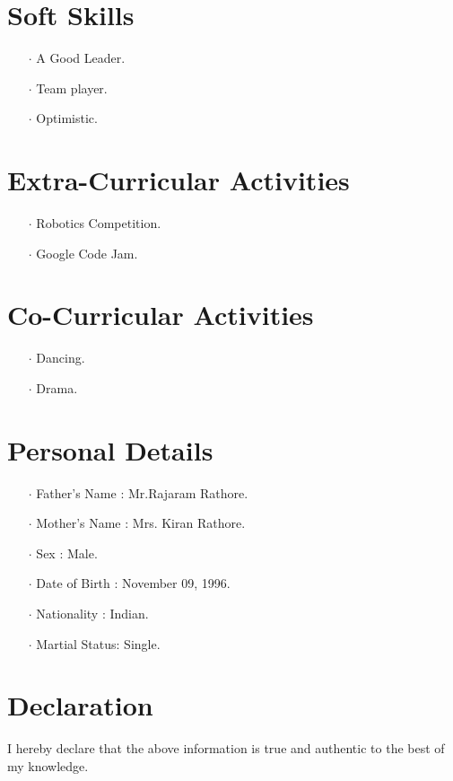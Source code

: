 \documentclass[12pt]{article}
\begin{document}
\section*{Soft Skills}
\begin{itemize}
\item[$\cdot$] A Good Leader.
\item[$\cdot$] Team player.
\item[$\cdot$] Optimistic. 
\end{itemize}
\section*{Extra-Curricular Activities}
\begin{itemize}
\item[$\cdot$] Robotics Competition.
\item[$\cdot$] Google Code Jam.
\end{itemize}
\section*{Co-Curricular Activities}
\begin{itemize} 
\item[$\cdot$] Dancing.
\item[$\cdot$] Drama. 
\end{itemize}
\section*{Personal Details}
\begin{itemize}
\item[$\cdot$]Father's Name : Mr.Rajaram Rathore.
\item[$\cdot$]Mother's Name : Mrs. Kiran Rathore.
\item[$\cdot$]Sex           : Male.
\item[$\cdot$]Date of Birth : November 09, 1996.
\item[$\cdot$]Nationality   : Indian.
\item[$\cdot$]Martial Status: Single.
\end{itemize}
\section*{Declaration} I hereby declare that the above information is true and authentic to the best of my knowledge.
\end{document}
